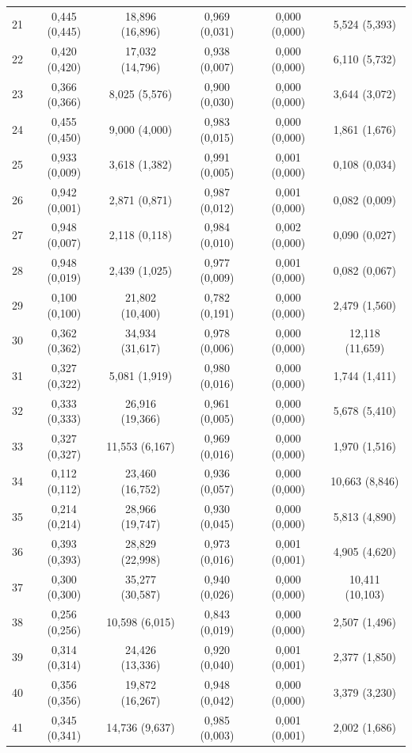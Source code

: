 \begin{tabular}{l c c c c c}
21 & 0,445 (0,445) & 18,896 (16,896) & 0,969 (0,031) & 0,000 (0,000) & 5,524 (5,393) \\
22 & 0,420 (0,420) & 17,032 (14,796) & 0,938 (0,007) & 0,000 (0,000) & 6,110 (5,732) \\
23 & 0,366 (0,366) & 8,025 (5,576) & 0,900 (0,030) & 0,000 (0,000) & 3,644 (3,072) \\
24 & 0,455 (0,450) & 9,000 (4,000) & 0,983 (0,015) & 0,000 (0,000) & 1,861 (1,676) \\
25 & 0,933 (0,009) & 3,618 (1,382) & 0,991 (0,005) & 0,001 (0,000) & 0,108 (0,034) \\
26 & 0,942 (0,001) & 2,871 (0,871) & 0,987 (0,012) & 0,001 (0,000) & 0,082 (0,009) \\
27 & 0,948 (0,007) & 2,118 (0,118) & 0,984 (0,010) & 0,002 (0,000) & 0,090 (0,027) \\
28 & 0,948 (0,019) & 2,439 (1,025) & 0,977 (0,009) & 0,001 (0,000) & 0,082 (0,067) \\
29 & 0,100 (0,100) & 21,802 (10,400) & 0,782 (0,191) & 0,000 (0,000) & 2,479 (1,560) \\
30 & 0,362 (0,362) & 34,934 (31,617) & 0,978 (0,006) & 0,000 (0,000) & 12,118 (11,659) \\
31 & 0,327 (0,322) & 5,081 (1,919) & 0,980 (0,016) & 0,000 (0,000) & 1,744 (1,411) \\
32 & 0,333 (0,333) & 26,916 (19,366) & 0,961 (0,005) & 0,000 (0,000) & 5,678 (5,410) \\
33 & 0,327 (0,327) & 11,553 (6,167) & 0,969 (0,016) & 0,000 (0,000) & 1,970 (1,516) \\
34 & 0,112 (0,112) & 23,460 (16,752) & 0,936 (0,057) & 0,000 (0,000) & 10,663 (8,846) \\
35 & 0,214 (0,214) & 28,966 (19,747) & 0,930 (0,045) & 0,000 (0,000) & 5,813 (4,890) \\
36 & 0,393 (0,393) & 28,829 (22,998) & 0,973 (0,016) & 0,001 (0,001) & 4,905 (4,620) \\
37 & 0,300 (0,300) & 35,277 (30,587) & 0,940 (0,026) & 0,000 (0,000) & 10,411 (10,103) \\
38 & 0,256 (0,256) & 10,598 (6,015) & 0,843 (0,019) & 0,000 (0,000) & 2,507 (1,496) \\
39 & 0,314 (0,314) & 24,426 (13,336) & 0,920 (0,040) & 0,001 (0,001) & 2,377 (1,850) \\
40 & 0,356 (0,356) & 19,872 (16,267) & 0,948 (0,042) & 0,000 (0,000) & 3,379 (3,230) \\
41 & 0,345 (0,341) & 14,736 (9,637) & 0,985 (0,003) & 0,001 (0,001) & 2,002 (1,686) \\

\end{tabular}
